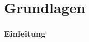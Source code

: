 \part{Grundlagen} %
\label{prt:grundlagen}

\section*{Einleitung} %
\label{sec:grundlagen_einleitung}
\thispagestyle{empty}







